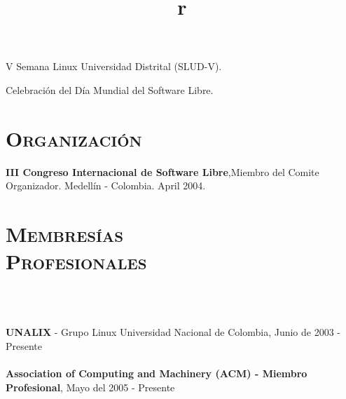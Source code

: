 \begin{resume}
\begin{position}
V Semana Linux Universidad Distrital (SLUD-V).
\end{position}


\begin{position}
Celebraci\'{o}n del D\'{i}a Mundial del Software Libre.
\end{position}



\section{\textsc{Organizaci\'{o}n}}
\employer{\textbf{}}
\dates{}
\textbf{III Congreso Internacional de Software Libre},Miembro del Comite Organizador. Medell\'{i}n - Colombia. April 2004.
\newline     


\section{\textsc{Membres\'{i}as\\ Profesionales}}

\begin{formatb}
  \\
  \body\\
\end{formatb}
\employer{}
   {\textbf{UNALIX} - Grupo Linux Universidad Nacional de Colombia,
     Junio de 2003 - Presente \\ \\
    \textbf{Association of Computing and Machinery (ACM) - Miembro Profesional}, Mayo del  2005 - Presente \\ \\

     }



\begin{formatb}
  \title{r}\\
  \\
 \body\\
\end{formatb}


\end{resume}
